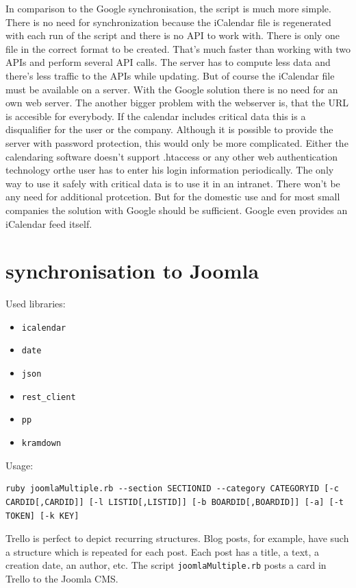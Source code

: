 In comparison to the Google synchronisation, the script is much more simple. There is no need for synchronization because the iCalendar file is regenerated with each run of the script and there is no API to work with. There is only one file in the correct format to be created. That's much faster than working with two APIs and perform several API calls. The server has to compute less data and there's less traffic to the APIs while updating. But of course the iCalendar file must be available on a server. With the Google solution there is no need for an own web server. The another bigger problem with the webserver is, that the URL is accesible for everybody. If the calendar includes critical data this is a disqualifier for the user or the company. Although it is possible to provide the server with password protection, this would only be more complicated. Either the calendaring software doesn't support .htaccess or any other web authentication technology orthe user has to enter his login information periodically. The only way to use it safely with critical data is to use it in an intranet. There won't be any need for additional protcetion. But for the domestic use and for most small companies the solution with Google  should be sufficient. Google even provides an iCalendar feed itself. 

\section{synchronisation to Joomla}

Used libraries:
\begin{itemize}
	\item \texttt{icalendar}
	\item \texttt{date}
	\item \texttt{json}
	\item \texttt{rest\_client}
	\item \texttt{pp}
	\item \texttt{kramdown}
\end{itemize}

Usage:
\begin{lstlisting}[aboveskip=1\baselineskip, style=bash, caption=\texttt{joomlaMultiple.rb} usage., label=listing028]
ruby joomlaMultiple.rb --section SECTIONID --category CATEGORYID [-c CARDID[,CARDID]] [-l LISTID[,LISTID]] [-b BOARDID[,BOARDID]] [-a] [-t TOKEN] [-k KEY]
\end{lstlisting}

Trello is perfect to depict recurring structures. Blog posts, for example, have such a structure which is repeated for each post. Each post has a title, a text, a creation date, an author, etc. The script \texttt{joomlaMultiple.rb} posts a card in Trello to the Joomla CMS.

